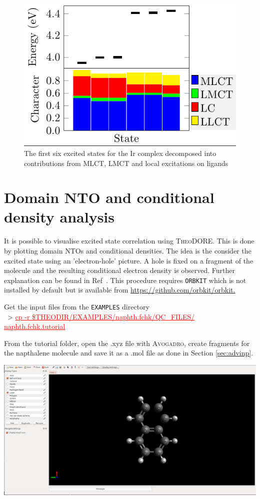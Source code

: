 \documentclass[DIV=12,headings=normal]{scrartcl}
\newcommand{\redl}[1]{{\textcolor{red}{\underline{#1}}}}
\newcommand{\comm}[1]{
\small
~> \redl{#1}
\normalsize
}
\newcommand{\theo}{\textsc{TheoDORE}}
\begin{document}
\begin{figure}[h]
\begin{center}
\includegraphics[trim=0.0cm 0.1cm 0.0cm 0cm, clip=true, scale=1]{Om_bars.png}
\caption{The first six excited states for the Ir complex decomposed into contributions from MLCT, LMCT and local excitations on ligands}
\label{fig:ombars}
\end{center}
\end{figure}
\clearpage

\section{Domain NTO and conditional density analysis}
It is possible to visualise excited state correlation using \theo{}. This is done by plotting domain NTOs and conditional densities. The idea is the consider the excited state using an 'electron-hole' picture. A hole is fixed on a fragment of the molecule and the resulting conditional electron density is observed. Further explanation can be found in Ref~\cite{ExcCorr}. This procedure requires \texttt{ORBKIT} which is not installed by default but is available from \url{https://github.com/orbkit/orbkit.}

Get the input files from the \texttt{EXAMPLES} directory\\
\comm{cp -r \$THEODIR/EXAMPLES/naphth.fchk/QC\_FILES/ naphth.fchk.tutorial}

From the tutorial folder, open the .xyz file with \textsc{Avogadro}, create fragments for the napthalene molecule and save it as a .mol file as done in Section \ref{sec:advinp}. 

\includegraphics[trim=0cm 0cm 0.1cm 0cm, clip=true, scale=0.23]{naphth_frag.png}
\end{document}
